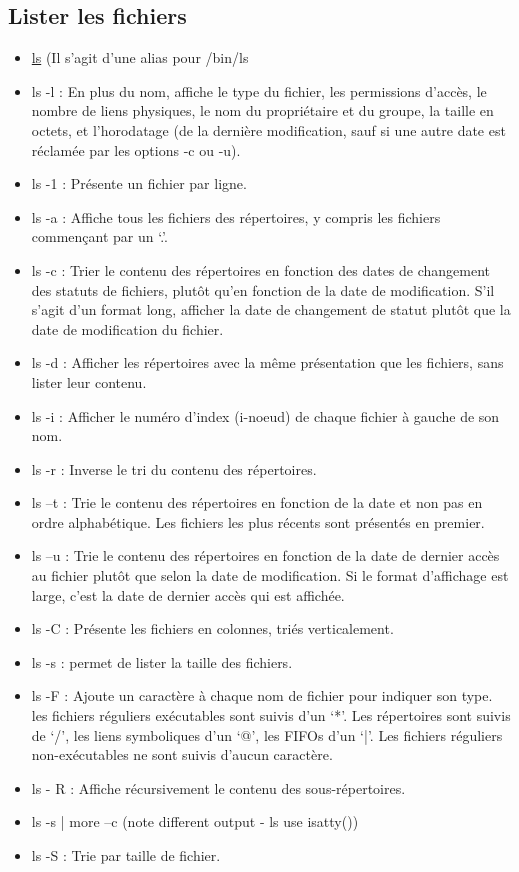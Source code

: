 \documentclass{article}[12pt]
\begin{document}
\subsection{Lister les fichiers}
\begin{itemize}
	\item \href{http://jp.barralis.com/linux-man/man1/ls.1.php}{ls} (Il s'agit d'une alias pour /bin/ls
    \item ls -l : En  plus  du  nom, affiche le type du fichier, les permissions d'accès, le nombre de liens  physiques, le  nom  du propriétaire et du groupe, la taille en octets, et l'horodatage (de la  dernière  modification,  sauf  si une autre date est réclamée par les options -c ou -u).
    \item ls -1 : Présente un fichier par ligne.
    \item ls -a : Affiche tous les fichiers des répertoires, y  compris les fichiers commençant par un `.'.
    \item ls -c : Trier  le  contenu  des répertoires en fonction des dates de changement des statuts de fichiers, plutôt qu'en  fonction  de  la date de modification.  S'il
s'agit  d'un  format  long,  afficher  la  date  de changement  de statut plutôt que la date de modification du fichier.
	\item ls -d :  Afficher les répertoires avec la même  présentation que  les  fichiers,  sans  lister leur contenu.  
    \item ls -i : Afficher le  numéro  d'index  (i-noeud)  de  chaque fichier à gauche de son nom.
    \item ls -r :  Inverse le tri du contenu des répertoires.
    \item ls –t : Trie le contenu des répertoires en fonction de la date et non pas en ordre alphabétique. Les fichiers les plus récents sont présentés en premier.
    \item ls –u : Trie  le contenu des répertoires en fonction de la date de dernier accès au fichier plutôt  que  selon la  date  de modification. Si le format d'affichage est large, c'est la date de dernier accès  qui  est affichée.
    \item ls -C : Présente  les  fichiers  en colonnes, triés verticalement.
    \item ls -s : permet de lister la taille des fichiers. 
    \item ls -F : Ajoute un caractère à chaque nom de  fichier  pour indiquer son type.  les fichiers réguliers exécutables sont suivis d'un  `*'.  Les  répertoires  sont suivis  de `/', les liens symboliques d'un `@', les FIFOs  d'un  `|'.   Les  fichiers  réguliers   non-exécutables ne sont suivis d'aucun caractère.
    \item ls - R : Affiche  récursivement  le contenu des sous-répertoires.
	\item ls -s | more –c (note different output - ls use isatty())
	\item ls -S : Trie par taille de fichier.
\end{itemize}
\end{document}
